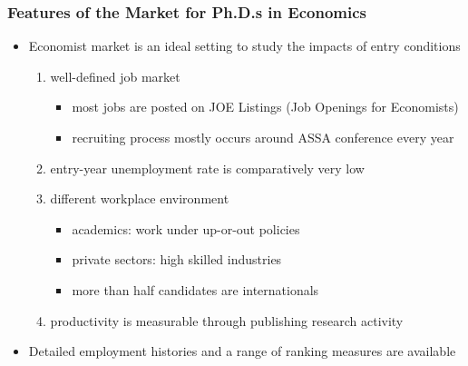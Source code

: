\documentclass[10pt,svgnames,fragile]{beamer}
\begin{document}
\begin{frame}
	\frametitle{Features of the Market for Ph.D.s in Economics}
	\begin{itemize}
			\item Economist market is an ideal setting to study the impacts of entry conditions 
	\vspace{2 mm}
			\begin{enumerate}
				\item well-defined job market
				\begin{itemize}
						\vspace{1 mm}
					\item most jobs are posted on JOE Listings (Job Openings for Economists)
						\vspace{1 mm}
					\item recruiting process mostly occurs around ASSA conference every year 
				\end{itemize}
	\vspace{1 mm}
				\item entry-year unemployment rate is comparatively very low
		\vspace{2.5 mm}
				\item different workplace environment
					\vspace{1 mm}
				\begin{itemize}
				\item academics: work under up-or-out policies
					\vspace{1 mm}
				\item private sectors:  high skilled industries
					\vspace{1 mm}
				\item more than half candidates are internationals 
					\vspace{1 mm}
				\end{itemize}
			\vspace{1 mm}
				\item productivity is measurable through publishing research activity
			\end{enumerate}
\vfill
			\item Detailed employment histories and a range of ranking measures are available	
\vfill
	\end{itemize}
\end{frame}
\end{document}

